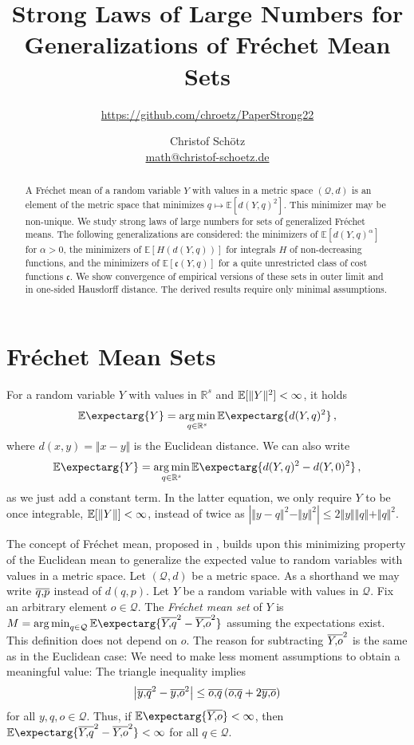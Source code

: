 \documentclass{scrartcl}
\newcommand{\Eof}[1]{\E[#1]}
\newcommand{\Ex}{\E\expectarg}
\newcommand*{\mc}[1]{\mathcal{#1}}
\newcommand*{\mf}[1]{\mathfrak{#1}}
\newcommand{\R}{\mathbb{R}}
\newcommand{\normof}[1]{\Vert #1 \Vert}
\newcommand{\equationComma}{\, ,}
\newcommand{\eqcm}{\equationComma}
\DeclareMathOperator*{\argmin}{arg\,min}
\theoremstyle{plain}\newtheorem{theorem}{Theorem}[section]
\theoremstyle{definition}
\theoremstyle{remark}
\begin{document}
\title{Strong Laws of Large Numbers for Generalizations of Fréchet Mean Sets}
\subtitle{\url{https://github.com/chroetz/PaperStrong22}}
\author{Christof Schötz\\\href{mailto:math@christof-schoetz.de}{math@christof-schoetz.de}}
\date{}
\maketitle
\begin{abstract} 
A Fréchet mean of a random variable $Y$ with values in a metric space $(\mathcal Q, d)$ is an element of the metric space that minimizes $q \mapsto \mathbb E[d(Y,q)^2]$. This minimizer may be non-unique. 
We study strong laws of large numbers for sets of generalized Fréchet means.
The following generalizations are considered: 
the minimizers of $\mathbb E[d(Y, q)^\alpha]$ for $\alpha > 0$,
the minimizers of $\mathbb E[H(d(Y, q))]$ for integrals $H$ of non-decreasing functions, and
the minimizers of $\mathbb E[\mathfrak c(Y, q)]$ for a quite unrestricted class of cost functions $\mf c$.
We show convergence of empirical versions of these sets in outer limit and in one-sided Hausdorff distance. The derived results require only minimal assumptions.
 \end{abstract}
\section{Fréchet Mean Sets}
For a random variable $Y$ with values in $\R^s$ and $\Eof{\normof{Y}^2}<\infty$, it holds
\begin{equation*}
	\Ex{Y} = \argmin_{q\in\R^s} \Ex{d(Y,q)^2}
	\eqcm
\end{equation*}
where $d(x,y) = \normof{x-y}$ is the Euclidean distance. We can also write 
\begin{equation*}
	\Ex{Y} = \argmin_{q\in\R^s} \Ex{d(Y,q)^2-d(Y,0)^2}
	\eqcm
\end{equation*}
as we just add a constant term. In the latter equation, we only require $Y$ to be once integrable, $\Eof{\normof{Y}}<\infty$, instead of twice as $|\normof{y-q}^2-\normof{y}^2| \leq 2\normof{y}\normof{q}+\normof{q}^2$.

The concept of Fréchet mean, proposed in \cite{frechet48}, builds upon this minimizing property of the Euclidean mean to generalize the expected value to random variables with values in a metric space. Let $(\mc Q, d)$ be a metric space. As a shorthand we may write $\overline{q,\!p}$ instead of $d(q,p)$. Let $Y$ be a random variable with values in $\mc Q$. Fix an arbitrary element $o\in \mc Q$. The \emph{Fréchet mean set} of $Y$ is $M = \argmin_{q\in\mc Q} \Ex{\ol Yq^2- \ol Yo^2}$ assuming the expectations exist. 
This definition does not depend on $o$. The reason for subtracting $\overline{Y,\!o}^2$ is the same as in the Euclidean case: We need to make less moment assumptions to obtain a meaningful value: The triangle inequality implies
\begin{equation*}
\left| \overline{y,\!q}^2 - \overline{y,\!o}^2 \right| \leq \overline{o,\!q} \left( \overline{o,\!q} + 2 \overline{y,\!o} \right)
\end{equation*}
for all $y,q,o\in\mc Q$. Thus, if $\Ex{\ol Yo} < \infty$, then $\Ex{\ol Yq^2 - \ol Yo^2} < \infty$ for all $q\in\mc Q$.
\end{document}
